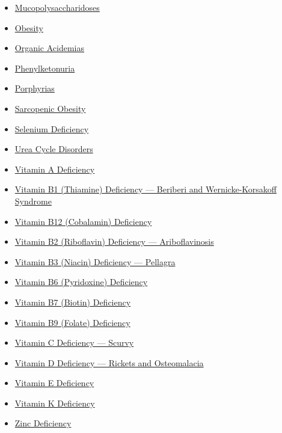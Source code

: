 \begin{itemize}[noitemsep]
  \item \hyperlink{sec:Mucopolysaccharidoses}{Mucopolysaccharidoses}
  \item \hyperlink{sec:Obesity}{Obesity}
  \item \hyperlink{sec:Organic Acidemias}{Organic Acidemias}
  \item \hyperlink{sec:Phenylketonuria}{Phenylketonuria}
  \item \hyperlink{sec:Porphyrias}{Porphyrias}
  \item \hyperlink{sec:Sarcopenic Obesity}{Sarcopenic Obesity}
  \item \hyperlink{sec:Selenium Deficiency}{Selenium Deficiency}
  \item \hyperlink{sec:Urea Cycle Disorders}{Urea Cycle Disorders}
  \item \hyperlink{sec:Vitamin A Deficiency}{Vitamin A Deficiency}
  \item \hyperlink{sec:Vitamin B1 Deficiency}{Vitamin B1 (Thiamine) Deficiency --- Beriberi and Wernicke-Korsakoff Syndrome}
  \item \hyperlink{sec:Vitamin B12 Deficiency}{Vitamin B12 (Cobalamin) Deficiency}
  \item \hyperlink{sec:Vitamin B2 Deficiency}{Vitamin B2 (Riboflavin) Deficiency --- Ariboflavinosis}
  \item \hyperlink{sec:Vitamin B3 Deficiency}{Vitamin B3 (Niacin) Deficiency --- Pellagra}
  \item \hyperlink{sec:Vitamin B6 Deficiency}{Vitamin B6 (Pyridoxine) Deficiency}
  \item \hyperlink{sec:Vitamin B7 Deficiency}{Vitamin B7 (Biotin) Deficiency}
  \item \hyperlink{sec:Vitamin B9 Deficiency}{Vitamin B9 (Folate) Deficiency}
  \item \hyperlink{sec:Vitamin C Deficiency}{Vitamin C Deficiency --- Scurvy}
  \item \hyperlink{sec:Vitamin D Deficiency}{Vitamin D Deficiency --- Rickets and Osteomalacia}
  \item \hyperlink{sec:Vitamin E Deficiency}{Vitamin E Deficiency}
  \item \hyperlink{sec:Vitamin K Deficiency}{Vitamin K Deficiency}
  \item \hyperlink{sec:Zinc Deficiency}{Zinc Deficiency}
\end{itemize}

